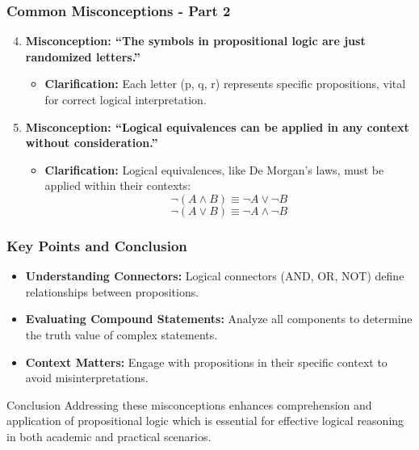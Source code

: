 \documentclass[aspectratio=169]{beamer}
\begin{document}
\begin{frame}[fragile]
    \frametitle{Common Misconceptions - Part 2}
    \begin{enumerate}
        \setcounter{enumi}{3}
        \item \textbf{Misconception: “The symbols in propositional logic are just randomized letters.”}
        \begin{itemize}
            \item \textbf{Clarification:} Each letter (p, q, r) represents specific propositions, vital for correct logical interpretation.
        \end{itemize}
        
        \item \textbf{Misconception: “Logical equivalences can be applied in any context without consideration.”}
        \begin{itemize}
            \item \textbf{Clarification:} Logical equivalences, like De Morgan’s laws, must be applied within their contexts:
            \begin{equation}
                \neg (A \land B) \equiv \neg A \lor \neg B
            \end{equation}
            \begin{equation}
                \neg (A \lor B) \equiv \neg A \land \neg B
            \end{equation}
        \end{itemize}
    \end{enumerate}
\end{frame}

\begin{frame}[fragile]
    \frametitle{Key Points and Conclusion}
    \begin{itemize}
        \item \textbf{Understanding Connectors:} Logical connectors (AND, OR, NOT) define relationships between propositions.
        \item \textbf{Evaluating Compound Statements:} Analyze all components to determine the truth value of complex statements.
        \item \textbf{Context Matters:} Engage with propositions in their specific context to avoid misinterpretations.
    \end{itemize}

    \begin{block}{Conclusion}
        Addressing these misconceptions enhances comprehension and application of propositional logic which is essential for effective logical reasoning in both academic and practical scenarios.
    \end{block}
\end{frame}
\end{document}
